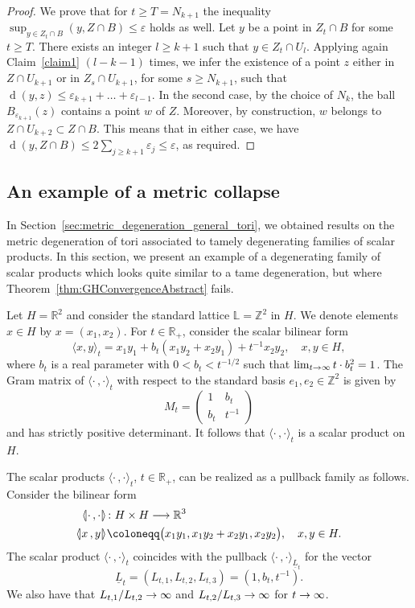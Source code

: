 \documentclass[AHL,Unicode,longabstracts]{cedram}
\newcommand{\innone}[2]{{\langle#2\rangle_{#1}}}
\newcommand{\llangle}{\mathopen{\langle\mkern -3.1mu\lvert}}
\newcommand{\rrangle}{\mathclose{\rvert\mkern -3.1mu\rangle}}
\newcommand{\highinn}[2]{{\llangle#2\rrangle_{#1}}}
\DeclareMathOperator{\dist}{d}
\newcommand{\R}{\mathbb{R}}
\newcommand{\Z}{\mathbb{Z}}
\renewcommand{\L}{\mathbb{L}}
\renewcommand*{\to}{\mathchoice{\longrightarrow}{\rightarrow}{\rightarrow}{\rightarrow}}
\begin{document}
\begin{proof}
We prove that for $t \ge T = N_{k+1}$ the inequality $\sup_{y \in Z_t \cap B} (y, Z\cap B) \leq \varepsilon$ holds as well. Let $y$ be a point in $Z_t \cap B$ for some $t\geq T$. There exists an integer $l \geq k+1$ such that $y \in Z_t\cap U_l$. Applying again Claim~\ref{claim1} $(l-k-1)$ times, we infer the existence of a point $z$ either in $Z \cap U_{k+1}$ or in $Z_s\cap U_{k+1}$, for some $s \geq N_{k+1}$, such that $\dist(y,z) \leq \varepsilon_{k+1}+ \dots + \varepsilon_{l-1}$. In the second case, by the choice of $N_k$, the ball $B_{\varepsilon_{k+1}}(z)$ contains a point $w$ of $Z$. Moreover, by construction, $w$ belongs to $Z \cap U_{k+2} \subset Z \cap B$. This means that in either case, we have $\dist(y, Z \cap B) \leq 2 \sum_{j \geq k+1}\varepsilon_{j} \leq \varepsilon$, as required.
\end{proof}



\subsection{An example of a metric collapse} \label{ss:PathologyTorus}
In Section~\ref{sec:metric_degeneration_general_tori}, we obtained results on the metric degeneration of tori associated to tamely degenerating families of scalar products. In this section, we present an example of a degenerating family of scalar products which looks quite similar to a tame degeneration, but where Theorem~\ref{thm:GHConvergenceAbstract} fails.



Let $H = \R^2$ and consider the standard lattice $\L = \Z^2$ in $H$. We denote elements $x \in H$ by $x = (x_1, x_2)$. For $t\in \R_+$, consider the scalar bilinear form
\[
\innone{t}{x,y} = x_1 y_1 + b_t (x_1 y_2 + x_2 y_1) + t^{-1} x_2 y_2,\quad x,y \in H,
\]
where $b_t$ is a real parameter with $0< b_t < t^{-1/2}$ such that $\lim_{t \to \infty} t \cdot b_t^2= 1$. The Gram matrix of $\innone{t}{\cdot\,,\cdot}$ with respect to the standard basis $e_1, e_2 \in \Z^2$ is given by
\[
M_t =
\begin{pmatrix}
1 & b_t \\
b_t & t^{-1}
\end{pmatrix}
\]
and has strictly positive determinant. It follows that $\innone{t}{\cdot\,, \cdot}$ is a scalar product on $H$.


The scalar products $\innone{t}{\cdot \,, \cdot}$, $t \in \R_+$, can be realized as a pullback family as follows. Consider the bilinear form
\begin{align*}
\highinn{}{\cdot\,,\cdot} &\colon H \times H \to \R^3\\
\highinn{}{x\,, y} &\coloneqq \bigl (x_1y_1, x_1 y_2 + x_2 y_1, x_2 y_2 \bigr), \quad x,y \in H.
\end{align*}
The scalar product $\innone{t}{\cdot\,, \cdot}$ coincides with the pullback $\innone{\underline L_t}{\cdot\,, \cdot}$ for the vector
\[
\underline L_t= (L_{t,1}, L_{t,2}, L_{t,3}) = \left(1, b_t, t^{-1}\right).
\]
We also have that $L_{t,1} / L_{t,2} \to \infty$ and $L_{t,2} /L_{t,3} \to \infty$ for $t \to \infty$.
\end{document}
